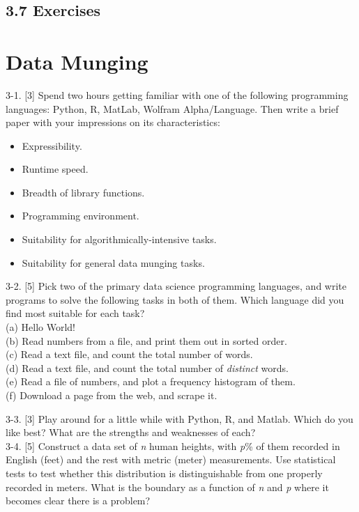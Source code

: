 \documentclass[10pt]{article}
\begin{document}
\subsection*{3.7 Exercises}
\section*{Data Munging}
3-1. [3] Spend two hours getting familiar with one of the following programming languages: Python, R, MatLab, Wolfram Alpha/Language. Then write a brief paper with your impressions on its characteristics:
\begin{itemize}
  \item Expressibility.
  \item Runtime speed.
  \item Breadth of library functions.
  \item Programming environment.
  \item Suitability for algorithmically-intensive tasks.
  \item Suitability for general data munging tasks.
\end{itemize}

3-2. [5] Pick two of the primary data science programming languages, and write programs to solve the following tasks in both of them. Which language did you find most suitable for each task?\\
(a) Hello World!\\
(b) Read numbers from a file, and print them out in sorted order.\\
(c) Read a text file, and count the total number of words.\\
(d) Read a text file, and count the total number of \textit{distinct} words.\\
(e) Read a file of numbers, and plot a frequency histogram of them.\\
(f) Download a page from the web, and scrape it.

3-3. [3] Play around for a little while with Python, R, and Matlab. Which do you like best? What are the strengths and weaknesses of each?\\
3-4. [5] Construct a data set of \textit{n} human heights, with \textit{p}\% of them recorded in English (feet) and the rest with metric (meter) measurements. Use statistical tests to test whether this distribution is distinguishable from one properly recorded in meters. What is the boundary as a function of \textit{n} and \textit{p} where it becomes clear there is a problem?
\end{document}
